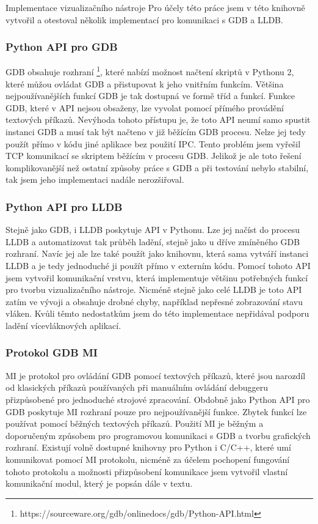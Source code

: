 \documentclass[bc,male,python,dept460]{diploma}						%
\begin{document}
\begin{section}{Implementace vizualizačního nástroje}
		Pro účely této práce jsem v této knihovně vytvořil a otestoval několik implementací pro komunikaci s GDB a LLDB.

		\subsubsection{Python API pro GDB}
		GDB obsahuje rozhraní \footnote{https://sourceware.org/gdb/onlinedocs/gdb/Python-API.html}, které nabízí možnost načtení skriptů v Pythonu 2, které
		můžou ovládat GDB a přistupovat k jeho vnitřním funkcím. Většina nejpoužívanějších funkcí GDB je tak dostupná ve formě tříd a funkcí.
		Funkce GDB, které v API nejsou obsaženy, lze vyvolat pomocí přímého provádění textových příkazů.
		Nevýhoda tohoto přístupu je, že toto API neumí samo spustit instanci GDB a musí tak být načteno v již běžícím GDB procesu.
		Nelze jej tedy použít přímo v kódu jiné aplikace bez použití IPC. Tento problém jsem vyřešil TCP komunikací se skriptem běžícím
		v procesu GDB. Jelikož je ale toto řešení komplikovanější než ostatní způsoby práce s GDB a při testování
		nebylo stabilní, tak jsem jeho implementaci nadále nerozšiřoval.
		
		\subsubsection{Python API pro LLDB}
		Stejně jako GDB, i LLDB poskytuje API v Pythonu. Lze jej načíst do procesu LLDB a automatizovat tak průběh ladění, stejně jako u dříve zmíněného GDB
		rozhraní. Navíc jej ale lze také použít jako knihovnu, která sama vytváří instanci LLDB a je tedy jednoduché ji použít přímo v externím kódu.
		Pomocí tohoto API jsem vytvořil komunikační vrstvu, která implementuje většinu potřebných funkcí pro tvorbu vizualizačního nástroje.
		Nicméně stejně jako celé LLDB je toto API zatím ve vývoji a obsahuje drobné chyby, například nepřesné zobrazování stavu vláken. Kvůli těmto nedostatkům
		jsem do této implementace nepřidával podporu ladění vícevláknových aplikací.
		
		\subsubsection{Protokol GDB MI}
		MI je protokol pro ovládání GDB pomocí textových příkazů, které jsou narozdíl od klasických příkazů používaných při manuálním ovládání debuggeru
		přizpůsobené pro jednoduché strojové zpracování. Obdobně jako Python API pro GDB poskytuje MI rozhraní pouze pro nejpoužívanější funkce.
		Zbytek funkcí lze používat pomocí běžných textových příkazů. Použití MI je běžným a doporučeným \cite{gdb-mi-usage} způsobem pro programovou komunikaci
		s GDB a tvorbu grafických rozhraní. Existují volně dostupné knihovny pro Python i C/C++, které umí komunikovat pomocí MI protokolu, nicméně za
		účelem pochopení fungování tohoto protokolu a možnosti přizpůsobení komunikace jsem vytvořil vlastní komunikační modul, který je popsán dále v textu.
		

\end{section}
\end{document}
